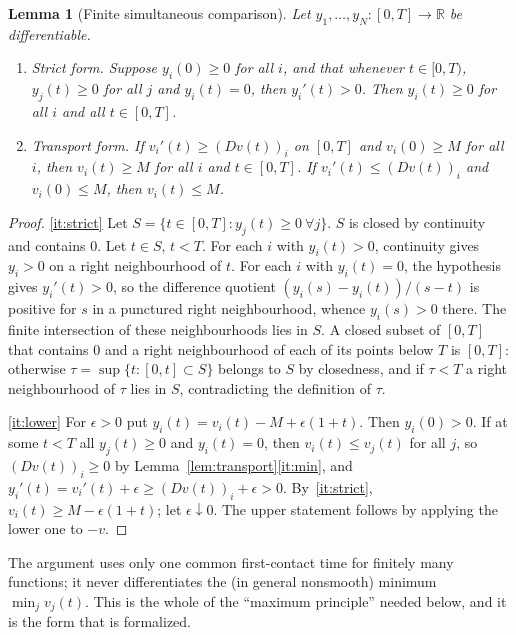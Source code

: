 \documentclass[11pt,a4paper]{article}
\theoremstyle{plain}
\newtheorem{lemma}[theorem]{Lemma}
\theoremstyle{definition}
\theoremstyle{remark}
\newcommand{\R}{\mathbb R}
\newcommand{\Dop}{D}
\begin{document}
\begin{lemma}[Finite simultaneous comparison]\label{lem:comparison}
Let $y_1,\dots,y_N:[0,T]\to\R$ be differentiable.
\begin{enumerate}[label=(\roman*)]
\item\label{it:strict} \emph{Strict form.} Suppose $y_i(0)\ge0$ for all $i$, and that whenever $t\in[0,T)$, $y_j(t)\ge0$ for all $j$ and $y_i(t)=0$, then $y_i'(t)>0$. Then $y_i(t)\ge0$ for all $i$ and all $t\in[0,T]$.
\item\label{it:lower} \emph{Transport form.} If $v_i'(t)\ge(\Dop v(t))_i$ on $[0,T]$ and $v_i(0)\ge M$ for all $i$, then $v_i(t)\ge M$ for all $i$ and $t\in[0,T]$. If $v_i'(t)\le(\Dop v(t))_i$ and $v_i(0)\le M$, then $v_i(t)\le M$.
\end{enumerate}
\end{lemma}
\begin{proof}
\ref{it:strict} Let $S=\{t\in[0,T]:y_j(t)\ge0\ \forall j\}$. $S$ is closed by continuity and contains $0$. Let $t\in S$, $t<T$. For each $i$ with $y_i(t)>0$, continuity gives $y_i>0$ on a right neighbourhood of $t$. For each $i$ with $y_i(t)=0$, the hypothesis gives $y_i'(t)>0$, so the difference quotient $(y_i(s)-y_i(t))/(s-t)$ is positive for $s$ in a punctured right neighbourhood, whence $y_i(s)>0$ there. The finite intersection of these neighbourhoods lies in $S$. A closed subset of $[0,T]$ that contains $0$ and a right neighbourhood of each of its points below $T$ is $[0,T]$: otherwise $\tau=\sup\{t:[0,t]\subset S\}$ belongs to $S$ by closedness, and if $\tau<T$ a right neighbourhood of $\tau$ lies in $S$, contradicting the definition of $\tau$.

\ref{it:lower} For $\epsilon>0$ put $y_i(t)=v_i(t)-M+\epsilon(1+t)$. Then $y_i(0)>0$. If at some $t<T$ all $y_j(t)\ge0$ and $y_i(t)=0$, then $v_i(t)\le v_j(t)$ for all $j$, so $(\Dop v(t))_i\ge0$ by Lemma~\ref{lem:transport}\ref{it:min}, and $y_i'(t)=v_i'(t)+\epsilon\ge(\Dop v(t))_i+\epsilon>0$. By~\ref{it:strict}, $v_i(t)\ge M-\epsilon(1+t)$; let $\epsilon\downarrow0$. The upper statement follows by applying the lower one to $-v$.
\end{proof}
The argument uses only one common first-contact time for finitely many functions; it never differentiates the (in general nonsmooth) minimum $\min_jv_j(t)$. This is the whole of the ``maximum principle'' needed below, and it is the form that is formalized.
\end{document}
